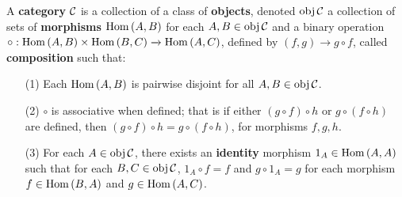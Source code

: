 

\begin{definition}
    A \textbf{category} $\mathcal{C}$ is a collection of a class of \textbf{objects},
    denoted $\operatorname{obj}{\mathcal{C}}$ a collection of sets of \textbf{morphisms} $\operatorname{Hom}{(A,B)}$
    for each $A,B \in \operatorname{obj}{\mathcal{C}}$ and a binary operation $\circ:\operatorname{Hom}{(A,B)}
    \times \operatorname{Hom}{(B,C)} \xrightarrow{} \operatorname{Hom}{(A,C)}$, defined by $(f,g) \xrightarrow{}
    g \circ f$, called \textbf{composition} such that:
    \begin{enumerate}
        \item[(1)] Each $\operatorname{Hom}{(A,B)}$ is pairwise disjoint for all $A,B \in
            \operatorname{obj}{\mathcal{C}}$.

        \item[(2)] $\circ$ is associative when defined; that is if either $(g
            \circ f) \circ h$ or $g \circ (f \circ h)$ are defined, then $(g
            \circ f) \circ h=g \circ (f \circ h)$, for morphisms $f,g,h$.

        \item[(3)] For each $A \in \operatorname{obj}{\mathcal{C}}$, there exists an \textbf{identity}
            morphism $1_A \in \operatorname{Hom}{(A,A)}$ such that for each $B,C \in
            \operatorname{obj}{\mathcal{C}}$, $1_A \circ f=f$ and  $g \circ 1_A=g$ for each morphism
            $f \in \operatorname{Hom}{(B,A)}$ and $g \in \operatorname{Hom}{(A,C)}$.
    \end{enumerate}
\end{definition}
